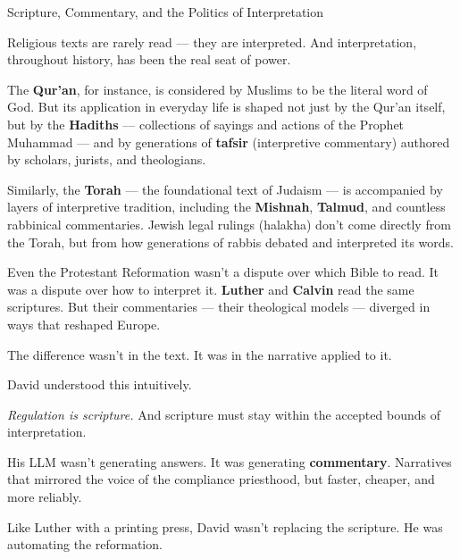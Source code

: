 \begin{HistoricalSidebar}{Scripture, Commentary, and the Politics of Interpretation}

    Religious texts are rarely read — they are interpreted.
    And interpretation, throughout history, has been the real seat of power.
    
    \medskip
    
    The \textbf{Qur’an}, for instance, is considered by Muslims to be the literal word of God. But its 
    application in everyday life is shaped not just by the Qur’an itself, but by the \textbf{Hadiths} --- 
    collections of sayings and actions of the Prophet Muhammad --- and by generations of \textbf{tafsir} 
    (interpretive commentary) authored by scholars, jurists, and theologians.
    
    \medskip
    
    Similarly, the \textbf{Torah} — the foundational text of Judaism — is accompanied by layers of 
    interpretive tradition, including the \textbf{Mishnah}, \textbf{Talmud}, and countless rabbinical commentaries. 
    Jewish legal rulings (halakha) don’t come directly from the Torah, but from how generations of rabbis 
    debated and interpreted its words.
    
    \medskip
    
    Even the Protestant Reformation wasn’t a dispute over which Bible to read. It was a dispute over how to 
    interpret it. \textbf{Luther} and \textbf{Calvin} read the same scriptures. But their commentaries ---
    their theological models --- diverged in ways that reshaped Europe.  

    \medskip
    
    The difference wasn’t in the text. It was in the narrative applied to it.
    
    \medskip
    
    David understood this intuitively.

    \medskip
    
    \textit{Regulation is scripture.} And scripture must stay within the accepted bounds of interpretation.
    
    \medskip
    
    His LLM wasn’t generating answers. It was generating \textbf{commentary}.
    Narratives that mirrored the voice of the compliance priesthood, but faster, cheaper, and more reliably.

    \medskip
    
    Like Luther with a printing press, David wasn’t replacing the scripture.
    He was automating the reformation.
    
\end{HistoricalSidebar}

